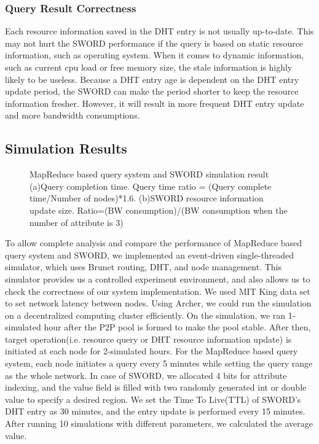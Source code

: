 \documentclass{acm_proc_article-sp}
\begin{document}
\subsubsection{Query Result Correctness}
Each resource information saved in the DHT entry is not usually up-to-date. This may not hurt the SWORD performance if the query is based on static resource information, such as operating system. 
When it comes to dynamic information, such as current cpu load or free memory size, the stale information is highly likely to be useless. 
Because a DHT entry age is dependent on the DHT entry update period, the SWORD can make the period shorter to keep the resource information fresher.
However, it will result in more frequent DHT entry update and more bandwidth consumptions.
\subsection{Simulation Results}
\begin{figure}[t]
\centering
{}
\caption{MapReduce based query system and SWORD simulation result (a)Query completion time. Query time ratio = (Query complete time/Number of nodes)*1.6. 
(b)SWORD resource information update size. Ratio=(BW consumption)/(BW consumption when the number of attribute is 3)}
\end{figure}
To allow complete analysis and compare the performance of MapReduce based query system and SWORD, we implemented an event-driven single-threaded simulator, which uses Brunet\cite{brunet} routing, DHT, and node management.
This simulator provides us a controlled experiment environment, and also allows us to check the correctness of our system implementation. We used MIT King data set\cite{king} to set network latency between nodes.
Using Archer\cite{archer}, we could run the simulation on a decentralized computing cluster efficiently. 
On the simulation, we ran 1-simulated hour after the P2P pool is formed to make the pool stable. After then, target operation(i.e. resource query or DHT resource information update) is initiated at each node for 2-simulated hours.
For the MapReduce based query system, each node initiates a query every 5 minutes while setting the query range as the whole network. 
In case of SWORD, we allocated 4 bits for attribute indexing, and the value field is filled with two randomly generated int or double value to specify a desired region. 
We set the Time To Live(TTL) of SWORD's DHT entry as 30 minutes, and the entry update is performed every 15 minutes.
After running 10 simulations with different parameters, we calculated the average value.
\end{document}
